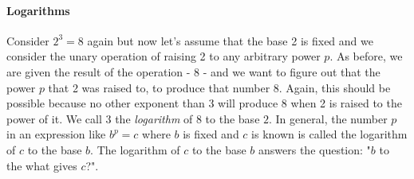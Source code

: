 \paragraph{Logarithms}
Consider $2^3 = 8$ again but now let's assume that the base 2 is fixed and we consider the unary operation of raising 2 to any arbitrary power $p$. As before, we are given the result of the operation - 8 - and we want to figure out that the power $p$ that 2 was raised to, to produce that number 8. Again, this should be possible because no other exponent than 3 will produce 8 when 2 is raised to the power of it. We call $3$ the \emph{logarithm} of $8$ to the base $2$. In general, the number $p$ in an expression like $b^p = c$ where $b$ is fixed and $c$ is known is called the logarithm of $c$ to the base $b$. The logarithm of $c$ to the base $b$ answers the question: "$b$ to the what gives $c$?".







